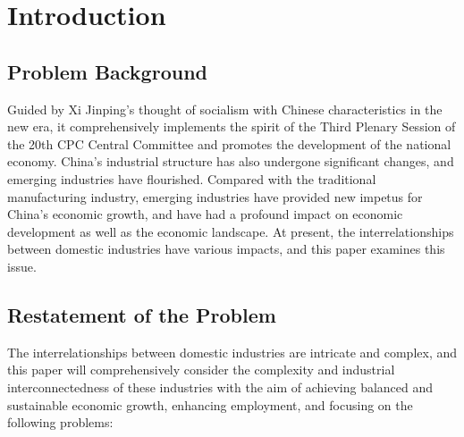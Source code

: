 \documentclass[12pt]{article}  %
\begin{document}
\maketitle  %

\tableofcontents  %


\section{Introduction}

\subsection{Problem Background} %

	Guided by Xi Jinping's thought of socialism with Chinese characteristics in the new era, it comprehensively implements the spirit of the Third Plenary Session of the 20th CPC Central Committee and promotes the development of the national economy. China's industrial structure has also undergone significant changes, and emerging industries have flourished. Compared with the traditional manufacturing industry, emerging industries have provided new impetus for China's economic growth, and have had a profound impact on economic development as well as the economic landscape. At present, the interrelationships between domestic industries have various impacts, and this paper examines this issue.





\subsection{Restatement of the Problem} %
	The interrelationships between domestic industries are intricate and complex, and this paper will comprehensively consider the complexity and industrial interconnectedness of these industries with the aim of achieving balanced and sustainable economic growth, enhancing employment, and focusing on the following problems:
\end{document}

